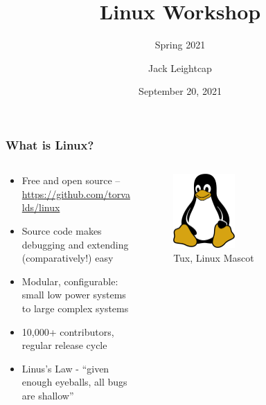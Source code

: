 \documentclass{beamer} \usetheme{Madrid}
\title{Linux Workshop}
\subtitle{Spring 2021}
\author[]{Jack Leightcap\inst{1}\inst{2}}
\institute[IEEE, Wireless Club]{
    \inst{1}IEEE -- \url{nuieeeofficers@gmail.com}
    \and
    \inst{2}Wireless Club -- \url{nuwirelessclub@gmail.com}
}
\date[Fall 2020]{September 20, 2021}
\begin{document}
\frame{\titlepage}

\begin{frame}
    \frametitle{What is Linux?}
    \begin{columns}
        \begin{column}{0.6\textwidth}
            \begin{itemize}
                \item Free and open source -- \url{https://github.com/torvalds/linux}
                \item Source code makes debugging and extending (comparatively!) easy
                \item Modular, configurable: small low power systems to large complex systems
                \item 10,000+ contributors, regular release cycle
                \item Linus's Law - ``given enough eyeballs, all bugs are shallow''
            \end{itemize}
        \end{column}
        \begin{column}{0.4\textwidth}
            \centering
            \begin{figure}
                \includegraphics[width=0.4\textwidth]{tux.png}
                \caption{Tux, Linux Mascot}
            \end{figure}
        \end{column}
    \end{columns}
\end{frame}
\end{document}
